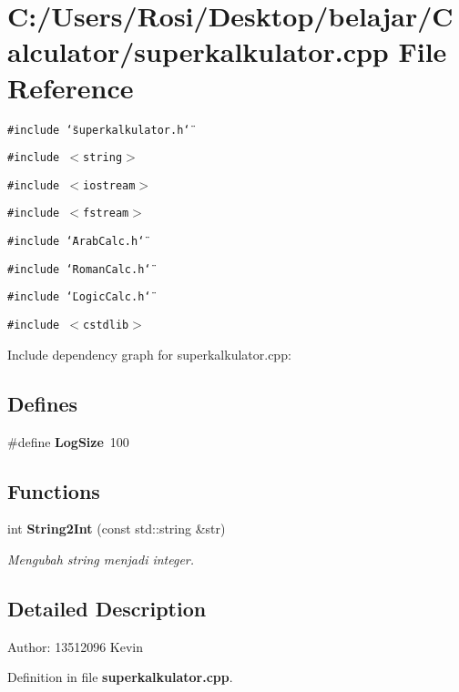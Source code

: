 \section{C:/Users/Rosi/Desktop/belajar/Calculator/superkalkulator.cpp File Reference}
\label{superkalkulator_8cpp}
{\tt \#include \char`\"{}superkalkulator.h\char`\"{}}\par
{\tt \#include $<$string$>$}\par
{\tt \#include $<$iostream$>$}\par
{\tt \#include $<$fstream$>$}\par
{\tt \#include \char`\"{}Arab\-Calc.h\char`\"{}}\par
{\tt \#include \char`\"{}Roman\-Calc.h\char`\"{}}\par
{\tt \#include \char`\"{}Logic\-Calc.h\char`\"{}}\par
{\tt \#include $<$cstdlib$>$}\par


Include dependency graph for superkalkulator.cpp:\subsection*{Defines}
\begin{CompactItemize}
\item 
\#define {\bf Log\-Size}~100\label{superkalkulator_8cpp_1de0ce7e12fae2d31360ed36ad565092}

\end{CompactItemize}
\subsection*{Functions}
\begin{CompactItemize}
\item 
int {\bf String2Int} (const std::string \&str)\label{superkalkulator_8cpp_4e641ae577d3199df1f75dde81656047}

\begin{CompactList}\small\item\em Mengubah string menjadi integer. \item\end{CompactList}\end{CompactItemize}


\subsection{Detailed Description}
\begin{Desc}
\item[Author:]13512096 Kevin \end{Desc}


Definition in file {\bf superkalkulator.cpp}.